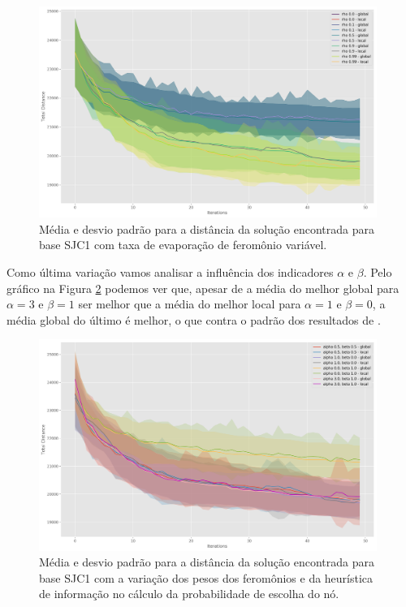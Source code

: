 \begin{figure}[h]	
  \centering
  \includegraphics[width=11cm,keepaspectratio]{images/SJC1_rho.png}
  \caption{Média e desvio padrão para a distância da solução encontrada para base SJC1 com taxa de evaporação de feromônio variável.}
  \label{fig:sjc1_rho}
\end{figure}

Como última variação vamos analisar a influência dos indicadores $\alpha$ e $\beta$. Pelo gráfico na Figura \ref{fig:sjc1_alpha_beta} podemos ver que, apesar de a média do melhor global para $\alpha = 3$ e $\beta = 1$ ser melhor que a média do melhor local para $\alpha = 1$ e $\beta = 0$, a média global do último é melhor, o que contra o padrão dos resultados de \cite{de2005max}.

\begin{figure}[h]	
  \centering
  \includegraphics[width=11cm,keepaspectratio]{images/SJC1_alpha_beta.png}
  \caption{Média e desvio padrão para a distância da solução encontrada para base SJC1 com a variação dos pesos dos feromônios e da heurística de informação no cálculo da probabilidade de escolha do nó.}
  \label{fig:sjc1_alpha_beta}
\end{figure}

